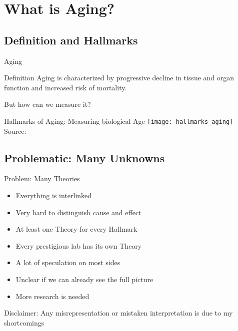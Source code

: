 \section{What is Aging?}

\subsection{Definition and Hallmarks}

\begin{frame}[c]{Aging}
    \large

    \begin{block}{Definition \cite{sen2016epigenetic}}
        Aging is characterized by progressive decline in tissue and organ
        function and increased risk of mortality.
    \end{block}
    \pause
    But how can we measure it?
\end{frame}


\begin{frame}[c]{Hallmarks of Aging: Measuring biological Age}
    \texttt{[image: hallmarks\_aging]} \\
    Source: \cite{lopez2013hallmarks}
\end{frame}

\subsection{Problematic: Many Unknowns}

\begin{frame}[c]{Problem: Many Theories}
    \large
    \begin{itemize}[<+(1)->]
        \item Everything is interlinked
        \item Very hard to distinguish cause and effect
        \item At least one Theory for every Hallmark
        \item Every prestigious lab has its own Theory
        \item A lot of speculation on most sides
        \item Unclear if we can already see the full picture
        \item More research is needed
    \end{itemize}
\end{frame}

\addtocounter{framenumber}{1}
\begin{frame}[standout]
    Disclaimer: Any misrepresentation or mistaken interpretation is due to my shortcomings
\end{frame}
